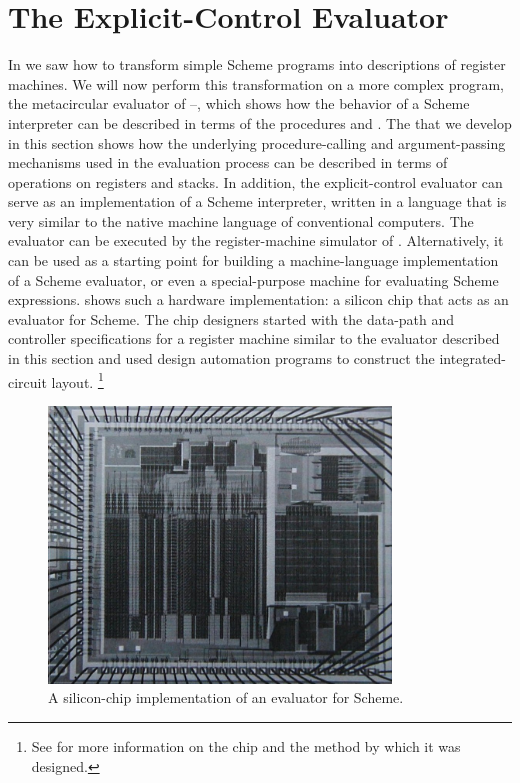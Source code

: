 \section{The Explicit-Control Evaluator}
\label{Section 5.4}

In  we saw how to transform simple Scheme programs into descriptions of register machines.
We will now perform this transformation on a more complex program, the metacircular evaluator of --, which shows how the behavior of a Scheme interpreter can be described in terms of the procedures  and .
The  that we develop in this section shows how the underlying procedure-calling and argument-passing mechanisms used in the evaluation process can be described in terms of operations on registers and stacks.
In addition, the explicit-control evaluator can serve as an implementation of a Scheme interpreter, written in a language that is very similar to the native machine language of conventional computers.
The evaluator can be executed by the register-machine simulator of .
Alternatively, it can be used as a starting point for building a machine-language implementation of a Scheme evaluator, or even a special-purpose machine for evaluating Scheme expressions.
 shows such a hardware implementation:
a silicon chip that acts as an evaluator for Scheme.
The chip designers started with the data-path and controller specifications for a register machine similar to the evaluator described in this section and used design automation programs to construct the integrated-circuit layout.%
\footnote{
	See \autocite{batali_et_al_scheme_81} for more information on the chip and the method by which it was designed.
}

\begin{figure}[tb]
	\centering
	\includegraphics[width=91mm]{fig/chap5/chip.jpg}
	\caption{
		A silicon-chip implementation of an evaluator for Scheme.
	}
	\label{Figure 5.16}
\end{figure}



